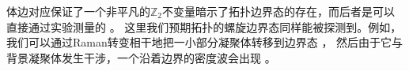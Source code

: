 体边对应保证了一个非平凡的$\mathbb Z_2$不变量暗示了拓扑边界态的存在，而后者是可以直接通过实验测量的 \cite{Goldman2012,Goldman2013,Goldman2013a,Celi2015}。
这里我们预期拓扑的螺旋边界态同样能被探测到。例如，我们可以通过Raman转变相干地把一小部分凝聚体转移到边界态 \cite{Ernst2009}，
然后由于它与背景凝聚体发生干涉，一个沿着边界的密度波会出现 \cite{Furukawa2015}。










































































































